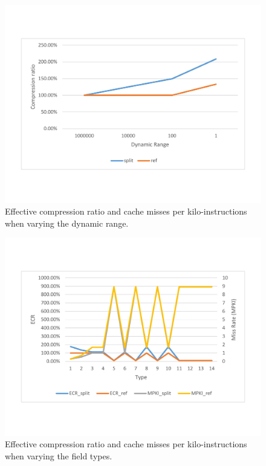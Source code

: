 \begin{figure}[htb]
\centering
\includegraphics[trim=0mm 0mm 0mm 0mm,clip,width=1\linewidth]{figs/figure3.pdf}
\caption{Effective compression ratio and cache misses per kilo-instructions when
varying the dynamic range.}
\label{fig:range}
\end{figure}

\begin{figure}[htb]
\centering
\includegraphics[trim=0mm 0mm 0mm 0mm,clip,width=1\linewidth]{figs/figure4.pdf}
\caption{Effective compression ratio and cache misses per kilo-instructions when
varying the field types.}
\label{fig:type}
\end{figure}

